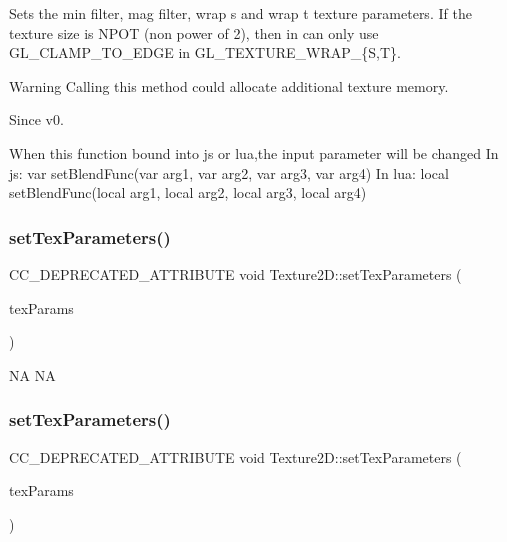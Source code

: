 Sets the min filter, mag filter, wrap s and wrap t texture parameters. If the texture size is N\+P\+OT (non power of 2), then in can only use G\+L\+\_\+\+C\+L\+A\+M\+P\+\_\+\+T\+O\+\_\+\+E\+D\+GE in G\+L\+\_\+\+T\+E\+X\+T\+U\+R\+E\+\_\+\+W\+R\+A\+P\+\_\+\{S,T\}.

\begin{DoxyWarning}{Warning}
Calling this method could allocate additional texture memory.
\end{DoxyWarning}
\begin{DoxySince}{Since}
v0. 
\begin{DoxyCode}
When \textcolor{keyword}{this} \textcolor{keyword}{function} bound into js or lua,the input parameter will be changed
In js: var setBlendFunc(var arg1, var arg2, var arg3, var arg4)
In lua: local setBlendFunc(local arg1, local arg2, local arg3, local arg4)
\end{DoxyCode}
 
\end{DoxySince}
\mbox{\label{classTexture2D_a002022936392284060c890589b3a4bca}} 
\subsubsection{\texorpdfstring{set\+Tex\+Parameters()}{setTexParameters()}\hspace{0.1cm}{\footnotesize\ttfamily [3/4]}}
{\footnotesize\ttfamily C\+C\+\_\+\+D\+E\+P\+R\+E\+C\+A\+T\+E\+D\+\_\+\+A\+T\+T\+R\+I\+B\+U\+TE void Texture2\+D\+::set\+Tex\+Parameters (\begin{DoxyParamCaption}\item[{const \hyperlink{classTexture2D_af2ea04a3dfcdf7274db17dda4bd555e3}{Tex\+Params} $\ast$}]{tex\+Params }\end{DoxyParamCaption})\hspace{0.3cm}{\ttfamily [inline]}}

NA  NA \mbox{\label{classTexture2D_a002022936392284060c890589b3a4bca}} 
\subsubsection{\texorpdfstring{set\+Tex\+Parameters()}{setTexParameters()}\hspace{0.1cm}{\footnotesize\ttfamily [4/4]}}
{\footnotesize\ttfamily C\+C\+\_\+\+D\+E\+P\+R\+E\+C\+A\+T\+E\+D\+\_\+\+A\+T\+T\+R\+I\+B\+U\+TE void Texture2\+D\+::set\+Tex\+Parameters (\begin{DoxyParamCaption}\item[{const \hyperlink{classTexture2D_af2ea04a3dfcdf7274db17dda4bd555e3}{Tex\+Params} $\ast$}]{tex\+Params }\end{DoxyParamCaption})\hspace{0.3cm}{\ttfamily [inline]}}

